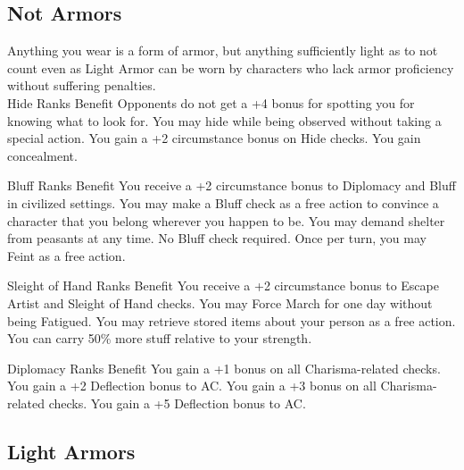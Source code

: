 \subsection{Not Armors}
\begin{multicols}{2}
Anything you wear is a form of armor, but anything sufficiently light as to not count even as Light Armor can be worn by characters who lack armor proficiency without suffering penalties.\\




{Hide Ranks Benefit
}{Opponents do not get a +4 bonus for spotting you for knowing what to look for.
}{You may hide while being observed without taking a special action.
}{You gain a +2 circumstance bonus on Hide checks.
}{You gain concealment.
}


{Bluff Ranks Benefit}
{You receive a +2 circumstance bonus to Diplomacy and Bluff in civilized settings.}
{You may make a Bluff check as a free action to convince a character that you belong wherever you happen to be.}
{You may demand shelter from peasants at any time. No Bluff check required.}
{Once per turn, you may Feint as a free action.}



{Sleight of Hand Ranks Benefit}
{You receive a +2 circumstance bonus to Escape Artist and Sleight of Hand checks.}
{You may Force March for one day without being Fatigued.}
{You may retrieve stored items about your person as a free action.}
{You can carry 50\% more stuff relative to your strength.}



{Diplomacy Ranks Benefit}
{You gain a +1 bonus on all Charisma-related checks.}
{You gain a +2 Deflection bonus to AC.}
{You gain a +3 bonus on all Charisma-related checks.}
{You gain a +5 Deflection bonus to AC.}



\subsection{Light Armors}


\end{multicols}
